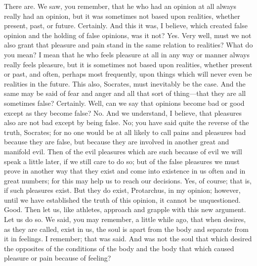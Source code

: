 \documentclass[letterpaper,12pt]{article}
\newcommand{\stephpag}[1]{\marginnote{\small\itshape\fontfamily{ppl}\selectfont #1}}
\begin{document}
\begin{drama}
\protarchusspeaks
There are.
\socratesspeaks
We saw, you remember, that he who had an opinion at all always really had an opinion, but it was sometimes not based upon realities, whether present, past, or future.
\protarchusspeaks
Certainly. \stephpag{d}
\socratesspeaks
And this it was, I believe, which created false opinion and the holding of false opinions, was it not?
\protarchusspeaks
Yes.
\socratesspeaks
Very well, must we not also grant that pleasure and pain stand in the same relation to realities?
\protarchusspeaks
What do you mean?
\socratesspeaks
I mean that he who feels pleasure at all in any way or manner always really feels pleasure, but it is sometimes not based upon realities, whether present or past, and often, perhaps most frequently, upon things which will never even be realities in the future. \stephpag{e}
\protarchusspeaks
This also, Socrates, must inevitably be the case.
\socratesspeaks
And the same may be said of fear and anger and all that sort of thing---that they are all sometimes false?
\protarchusspeaks
Certainly.
\socratesspeaks
Well, can we say that opinions become bad or good except as they become false?
\protarchusspeaks
No.
\socratesspeaks
And we understand, I believe, that pleasures also \stephpag{41 a} are not bad except by being false.
\protarchusspeaks
No; you have said quite the reverse of the truth, Socrates; for no one would be at all likely to call pains and pleasures bad because they are false, but because they are involved in another great and manifold evil.
\socratesspeaks
Then of the evil pleasures which are such because of evil we will speak a little later, if we still care to do so; but of the false pleasures we must prove in another way that they exist and come into existence in us often and in great numbers; \stephpag{b} for this may help us to reach our decisions.
\protarchusspeaks
Yes, of course; that is, if such pleasures exist.
\socratesspeaks
But they do exist, Protarchus, in my opinion; however, until we have established the truth of this opinion, it cannot be unquestioned.
\protarchusspeaks
Good.
\socratesspeaks
Then let us, like athletes, approach and grapple with this new argument.
\protarchusspeaks
Let us do so.
\socratesspeaks
We said, you may remember, a little while ago, \stephpag{c} that when desires, as they are called, exist in us, the soul is apart from the body and separate from it in feelings.
\protarchusspeaks
I remember; that was said.
\socratesspeaks
And was not the soul that which desired the opposites of the conditions of the body and the body that which caused pleasure or pain because of feeling?

\end{drama}
\end{document}
